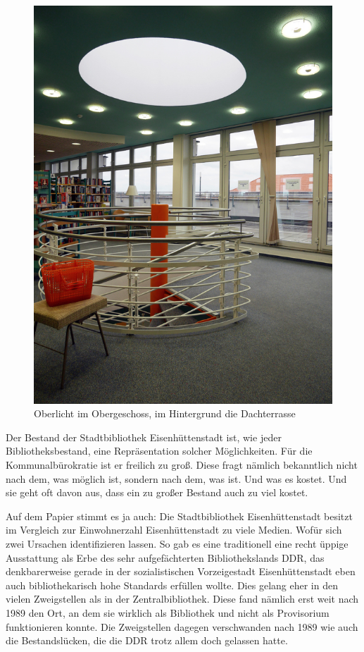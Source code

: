 \documentclass[a4paper,
fontsize=11pt,
oneside,
numbers=noperiodatend,
parskip=half-,
bibliography=totoc,
final
]{scrartcl}
\begin{document}
\begin{figure}
\centering
\includegraphics{img/image_1.jpg}
\caption{Oberlicht im Obergeschoss, im Hintergrund die Dachterrasse}
\end{figure}

Der Bestand der Stadtbibliothek Eisenhüttenstadt ist, wie jeder
Bibliotheksbestand, eine Repräsentation solcher Möglichkeiten. Für die
Kommunalbürokratie ist er freilich zu groß. Diese fragt nämlich
bekanntlich nicht nach dem, was möglich ist, sondern nach dem, was ist.
Und was es kostet. Und sie geht oft davon aus, dass ein zu großer
Bestand auch zu viel kostet.

Auf dem Papier stimmt es ja auch: Die Stadtbibliothek Eisenhüttenstadt
besitzt im Vergleich zur Einwohnerzahl Eisenhüttenstadt zu viele Medien.
Wofür sich zwei Ursachen identifizieren lassen. So gab es eine
traditionell eine recht üppige Ausstattung als Erbe des sehr
aufgefächterten Bibliothekslands DDR, das denkbarerweise gerade in der
sozialistischen Vorzeigestadt Eisenhüttenstadt eben auch
bibliothekarisch hohe Standards erfüllen wollte. Dies gelang eher in den
vielen Zweigstellen als in der Zentralbibliothek. Diese fand nämlich
erst weit nach 1989 den Ort, an dem sie wirklich als Bibliothek und
nicht als Provisorium funktionieren konnte. Die Zweigstellen dagegen
verschwanden nach 1989 wie auch die Bestandslücken, die die DDR trotz
allem doch gelassen hatte.
\end{document}
